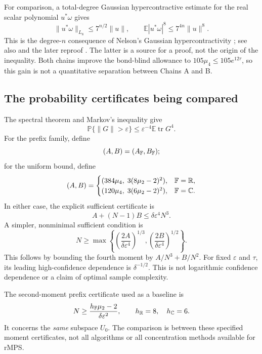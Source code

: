 \documentclass[11pt]{article}
\numberwithin{equation}{section}
\theoremstyle{definition}\newtheorem{definition}[theorem]{Definition}
\theoremstyle{remark}\newtheorem{remark}[theorem]{Remark}
\newcommand{\R}{\mathbb R}\newcommand{\E}{\mathbb E}\newcommand{\Prob}{\mathbb P}
\newcommand{\tr}{\operatorname{tr}}\newcommand{\Ent}{\operatorname{Ent}}
\newcommand{\norm}[1]{\lVert#1\rVert}\newcommand{\ip}[2]{\langle#1,#2\rangle}
\newcommand{\C}{\mathbb C}
\begin{document}
For comparison, a total-degree Gaussian hypercontractive estimate for the real
scalar polynomial $u^*\omega$ gives
\[
 \norm{u^*\omega}_{L_8}\le7^{n/2}\norm u,
 \qquad \E|u^*\omega|^8\le7^{4n}\norm u^8.
\]
This is the degree-$n$ consequence of Nelson's Gaussian hypercontractivity
\cite{Nelson}; see also \cite[Chapter~5]{Janson} and the later reproof
\cite[equation~(1.8) of the arXiv version]{DPLS}. The latter is a source for a
proof, not the origin of the inequality. Both chains improve the bond-blind
allowance to $105\mu_4\le105e^{12\tau}$, so this gain is not a quantitative
separation between Chains A and B.

\subsection{The probability certificates being compared}
The spectral theorem and Markov's inequality give
\begin{equation}\label{eq:Markov}
 \Prob\{\norm G>\varepsilon\}\le\varepsilon^{-4}\E\tr G^4.
\end{equation}
For the prefix family, define
\[
 (A,B)=(A_{\mathbb F},B_{\mathbb F});
\]
for the uniform bound, define
\begin{equation}\label{eq:uniformAB}
 (A,B)=\begin{cases}
 (384\mu_4,\;3(8\mu_2-2)^2),&\F=\R,\\
 (120\mu_4,\;3(6\mu_2-2)^2),&\F=\C.
 \end{cases}
\end{equation}
In either case, the explicit sufficient certificate is
\begin{equation}\label{eq:certificate}
 A+(N-1)B\le\delta\varepsilon^4N^3.
\end{equation}
A simpler, nonminimal sufficient condition is
\begin{equation}\label{eq:simplercert}
 N\ge\max\left\{\left(\frac{2A}{\delta\varepsilon^4}\right)^{1/3},
                      \left(\frac{2B}{\delta\varepsilon^4}\right)^{1/2}\right\}.
\end{equation}
This follows by bounding the fourth moment by $A/N^3+B/N^2$.
For fixed $\varepsilon$ and $\tau$, its leading high-confidence dependence is
$\delta^{-1/2}$. This is not logarithmic confidence dependence or a claim of
optimal sample complexity.

The second-moment prefix certificate used as a baseline is
\begin{equation}\label{eq:secondcert}
 N\ge\frac{h_{\F}\mu_2-2}{\delta\varepsilon^2},
 \qquad h_{\R}=8,\quad h_{\C}=6.
\end{equation}
It concerns the \emph{same} subspace $U_0$. The comparison is between these
specified moment certificates, not all algorithms or all concentration methods
available for rMPS.
\end{document}
